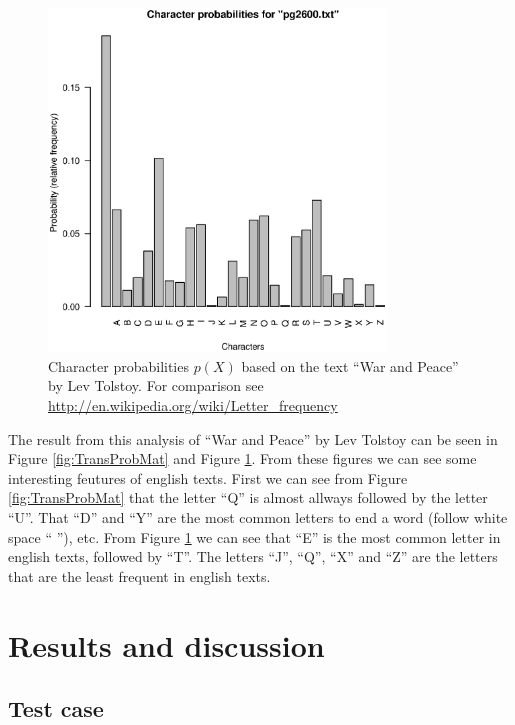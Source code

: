 \documentclass[a4paper, 11pt]{article}
\begin{document}
\begin{figure}[h]
  \centering
  \includegraphics[width=0.8\textwidth]{char_prob-pg2600-.eps}
  \caption{Character probabilities $p(X)$ based on the text
  ``War and Peace'' by Lev Tolstoy. For comparison see 
  \href{http://en.wikipedia.org/wiki/Letter_frequency}{http://en.wikipedia.org/wiki/Letter\_frequency}}
  \label{fig:CharProb}
\end{figure}

The result from this analysis of ``War and Peace'' by Lev Tolstoy can be
seen in Figure \ref{fig:TransProbMat} and Figure \ref{fig:CharProb}. From
these figures we can see some interesting feutures of english texts. First
we can see from Figure \ref{fig:TransProbMat} that the letter ``Q'' is almost
allways followed by the letter ``U''. That ``D'' and ``Y'' are the most common
letters to end a word (follow white space `` ''), etc. From Figure 
\ref{fig:CharProb} we can see that ``E'' is the most common letter in english
texts, followed by ``T''. The letters ``J'', ``Q'', ``X'' and ``Z'' are the
letters that are the least frequent in english texts.

\section{Results and discussion}

\subsection{Test case}
\end{document}
